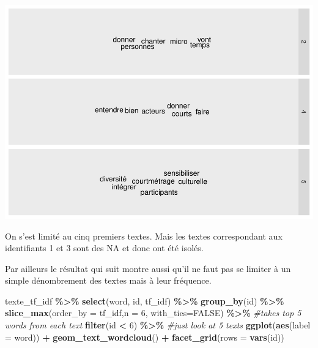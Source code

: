 \documentclass[
]{article}
\newenvironment{Shaded}{\begin{snugshade}}{\end{snugshade}}
\newcommand{\AttributeTok}[1]{\textcolor[rgb]{0.13,0.29,0.53}{#1}}
\newcommand{\CommentTok}[1]{\textcolor[rgb]{0.56,0.35,0.01}{\textit{#1}}}
\newcommand{\ConstantTok}[1]{\textcolor[rgb]{0.56,0.35,0.01}{#1}}
\newcommand{\DecValTok}[1]{\textcolor[rgb]{0.00,0.00,0.81}{#1}}
\newcommand{\FunctionTok}[1]{\textcolor[rgb]{0.13,0.29,0.53}{\textbf{#1}}}
\newcommand{\NormalTok}[1]{#1}
\newcommand{\SpecialCharTok}[1]{\textcolor[rgb]{0.81,0.36,0.00}{\textbf{#1}}}
\begin{document}
\includegraphics{Texte_mining_files/figure-latex/unnamed-chunk-17-1.pdf}

On s'est limité au cinq premiers textes. Mais les textes correspondant
aux identifiants 1 et 3 sont des NA et donc ont été isolés.

Par ailleurs le résultat qui suit montre aussi qu'il ne faut pas se
limiter à un simple dénombrement des textes mais à leur fréquence.

\begin{Shaded}
\begin{Highlighting}[]
\NormalTok{texte\_tf\_idf }\SpecialCharTok{\%\textgreater{}\%}
  \FunctionTok{select}\NormalTok{(word, id, tf\_idf) }\SpecialCharTok{\%\textgreater{}\%}
  \FunctionTok{group\_by}\NormalTok{(id) }\SpecialCharTok{\%\textgreater{}\%}
  \FunctionTok{slice\_max}\NormalTok{(}\AttributeTok{order\_by =}\NormalTok{ tf\_idf,}\AttributeTok{n =} \DecValTok{6}\NormalTok{, }\AttributeTok{with\_ties=}\ConstantTok{FALSE}\NormalTok{) }\SpecialCharTok{\%\textgreater{}\%} \CommentTok{\#takes top 5 words from each text}
  \FunctionTok{filter}\NormalTok{(id }\SpecialCharTok{\textless{}} \DecValTok{6}\NormalTok{) }\SpecialCharTok{\%\textgreater{}\%} \CommentTok{\#just look at 5 texts}
  \FunctionTok{ggplot}\NormalTok{(}\FunctionTok{aes}\NormalTok{(}\AttributeTok{label =}\NormalTok{ word)) }\SpecialCharTok{+} 
  \FunctionTok{geom\_text\_wordcloud}\NormalTok{() }\SpecialCharTok{+} 
  \FunctionTok{facet\_grid}\NormalTok{(}\AttributeTok{rows =} \FunctionTok{vars}\NormalTok{(id))}
\end{Highlighting}
\end{Shaded}
\end{document}

